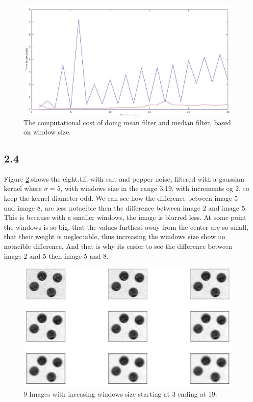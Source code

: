 \documentclass[11pt]{report}
\begin{document}
\begin{figure}[!ht]
    \centering
    \includegraphics[width=1\textwidth]{fig23.jpg}
    \caption{The computational cost of doing mean filter and median filter, based on window size.}
    \label{fig:2_3}
\end{figure}

\subsection{2.4}
Figure \ref{fig:2_4} shows the eight.tif, with salt and pepper noise, filtered with a gaussian kernel where $\sigma = 5$, with windows size in the range 3:19, with increments og 2, to keep the kernel diameter odd. We can see how the difference between image 5 and image 8, are less notacible then the difference between image 2 and image 5. This is because with a smaller windows, the image is blurred less. At some point the windows is so big, that the values furthest away from the center are so small, that their weight is neglectable, thus increasing the windows size show no notacible difference. And that is why its easier to see the difference between image 2 and 5 then image 5 and 8.

\begin{figure}[!ht]
    \centering
    \includegraphics[width=1\textwidth]{fig24.jpg}
    \caption{9 Images with inceasing windows size starting at 3 ending at 19.}
    \label{fig:2_4}
\end{figure}
\end{document}
